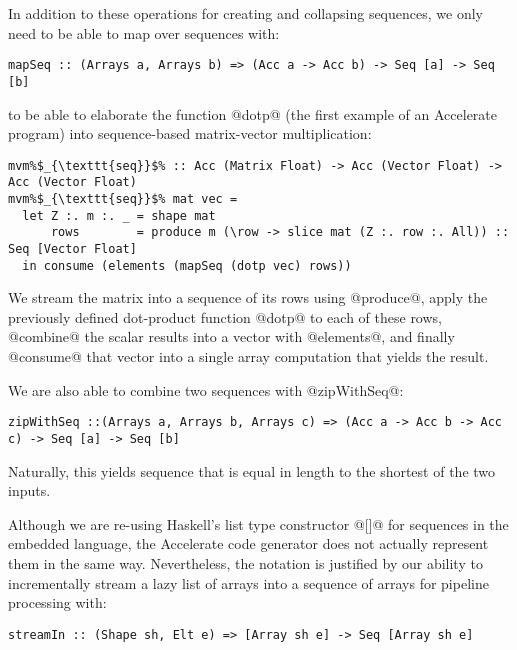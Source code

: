 In addition to these operations for creating and collapsing sequences, we only need to be able to map over sequences with:
%
\begin{lstlisting}
mapSeq :: (Arrays a, Arrays b) => (Acc a -> Acc b) -> Seq [a] -> Seq [b]
\end{lstlisting}
%
to be able to elaborate the function @dotp@ (the first example of an Accelerate program) into sequence-based matrix-vector multiplication:
%
\begin{lstlisting}
mvm%$_{\texttt{seq}}$% :: Acc (Matrix Float) -> Acc (Vector Float) -> Acc (Vector Float)
mvm%$_{\texttt{seq}}$% mat vec =
  let Z :. m :. _ = shape mat
      rows        = produce m (\row -> slice mat (Z :. row :. All)) :: Seq [Vector Float]
  in consume (elements (mapSeq (dotp vec) rows))
\end{lstlisting}
%
We stream the matrix into a sequence of its rows using @produce@, apply the previously defined dot-product function @dotp@ to each of these rows, @combine@ the scalar results into a vector with @elements@, and finally @consume@ that vector into a single array computation that yields the result.

We are also able to combine two sequences with @zipWithSeq@:
%
\begin{lstlisting}
zipWithSeq ::(Arrays a, Arrays b, Arrays c) => (Acc a -> Acc b -> Acc c) -> Seq [a] -> Seq [b]
\end{lstlisting}
%
Naturally, this yields sequence that is equal in length to the shortest of the two inputs.


Although we are re-using Haskell's list type constructor @[]@ for sequences in the embedded language, the Accelerate code generator does not actually represent them in the same way. Nevertheless, the notation is justified by our ability to incrementally stream a lazy list of arrays into a sequence of arrays for pipeline processing with:
%
\begin{lstlisting}
streamIn :: (Shape sh, Elt e) => [Array sh e] -> Seq [Array sh e]
\end{lstlisting}

